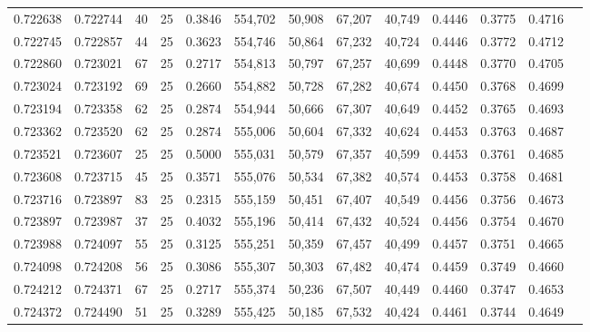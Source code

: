 \begin{tabular}{rrrrrrrrrrrrr}
0.722638 & 0.722744 &    40 &  25 &                                     0.3846 & 554,702 &  50,908 &  67,207 &  40,749 & 0.4446 & 0.3775 & 0.4716 \\
0.722745 & 0.722857 &    44 &  25 &                                     0.3623 & 554,746 &  50,864 &  67,232 &  40,724 & 0.4446 & 0.3772 & 0.4712 \\
0.722860 & 0.723021 &    67 &  25 &                                     0.2717 & 554,813 &  50,797 &  67,257 &  40,699 & 0.4448 & 0.3770 & 0.4705 \\
0.723024 & 0.723192 &    69 &  25 &                                     0.2660 & 554,882 &  50,728 &  67,282 &  40,674 & 0.4450 & 0.3768 & 0.4699 \\
0.723194 & 0.723358 &    62 &  25 &                                     0.2874 & 554,944 &  50,666 &  67,307 &  40,649 & 0.4452 & 0.3765 & 0.4693 \\
0.723362 & 0.723520 &    62 &  25 &                                     0.2874 & 555,006 &  50,604 &  67,332 &  40,624 & 0.4453 & 0.3763 & 0.4687 \\
0.723521 & 0.723607 &    25 &  25 &                                     0.5000 & 555,031 &  50,579 &  67,357 &  40,599 & 0.4453 & 0.3761 & 0.4685 \\
0.723608 & 0.723715 &    45 &  25 &                                     0.3571 & 555,076 &  50,534 &  67,382 &  40,574 & 0.4453 & 0.3758 & 0.4681 \\
0.723716 & 0.723897 &    83 &  25 &                                     0.2315 & 555,159 &  50,451 &  67,407 &  40,549 & 0.4456 & 0.3756 & 0.4673 \\
0.723897 & 0.723987 &    37 &  25 &                                     0.4032 & 555,196 &  50,414 &  67,432 &  40,524 & 0.4456 & 0.3754 & 0.4670 \\
0.723988 & 0.724097 &    55 &  25 &                                     0.3125 & 555,251 &  50,359 &  67,457 &  40,499 & 0.4457 & 0.3751 & 0.4665 \\
0.724098 & 0.724208 &    56 &  25 &                                     0.3086 & 555,307 &  50,303 &  67,482 &  40,474 & 0.4459 & 0.3749 & 0.4660 \\
0.724212 & 0.724371 &    67 &  25 &                                     0.2717 & 555,374 &  50,236 &  67,507 &  40,449 & 0.4460 & 0.3747 & 0.4653 \\
0.724372 & 0.724490 &    51 &  25 &                                     0.3289 & 555,425 &  50,185 &  67,532 &  40,424 & 0.4461 & 0.3744 & 0.4649 \\

\end{tabular}
